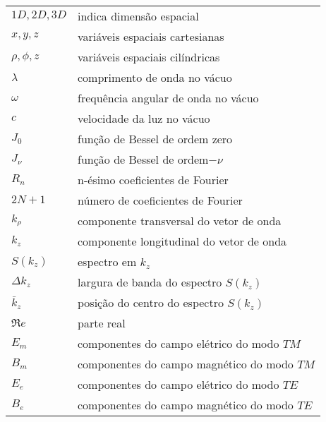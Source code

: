 \begin{tabular}{ll}
$1D, 2D, 3D$ & indica dimensão espacial\\
$ x, y, z$ & variáveis espaciais cartesianas\\
$ \rho, \phi, z$ & variáveis espaciais cilíndricas\\
$\lambda$ & comprimento de onda no vácuo\\
$\omega$ & frequência angular de onda no vácuo\\
$c$ & velocidade da luz no vácuo\\
$J_0$ & função de Bessel de ordem zero\\
$J_{\nu}$ & função de Bessel de ordem$-\nu$\\
$R_n$ & n-ésimo coeficientes de Fourier\\
$2N+1$ & número de coeficientes de Fourier\\
$k_{\rho}$ & componente transversal do vetor de onda\\
$k_{z}$ & componente longitudinal do vetor de onda\\
$S(k_z)$ & espectro em $k_z$\\
$\Delta k_z$ & largura de banda do espectro $S(k_z)$\\
$\bar{k}_{z}$ & posição do centro do espectro $S(k_z)$\\
$\Re e$ & parte real\\
$E_m$ & componentes do campo elétrico do modo $TM$\\
$B_m$ & componentes do campo magnético do modo $TM$\\
$E_e$ & componentes do campo elétrico do modo $TE$\\
$B_e$ & componentes do campo magnético do modo $TE$\\


\end{tabular}

